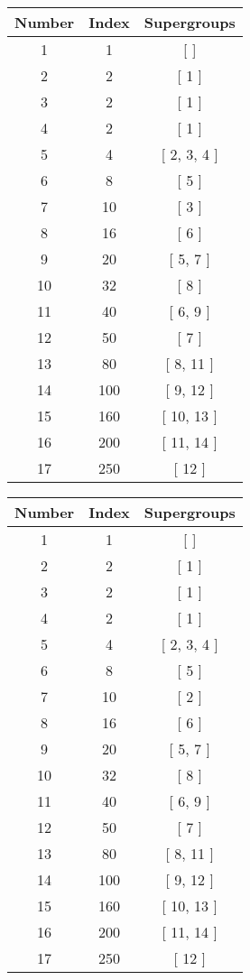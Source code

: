 \begin{center}
\begin{longtable}[H]{|| c c c ||}
\hline
Number & Index & Supergroups \\ 
\hline
1 & 1 & [  ] \\ 
\hline
2 & 2 & [ 1 ] \\ 
\hline
3 & 2 & [ 1 ] \\ 
\hline
4 & 2 & [ 1 ] \\ 
\hline
5 & 4 & [ 2, 3, 4 ] \\ 
\hline
6 & 8 & [ 5 ] \\ 
\hline
7 & 10 & [ 3 ] \\ 
\hline
8 & 16 & [ 6 ] \\ 
\hline
9 & 20 & [ 5, 7 ] \\ 
\hline
10 & 32 & [ 8 ] \\ 
\hline
11 & 40 & [ 6, 9 ] \\ 
\hline
12 & 50 & [ 7 ] \\ 
\hline
13 & 80 & [ 8, 11 ] \\ 
\hline
14 & 100 & [ 9, 12 ] \\ 
\hline
15 & 160 & [ 10, 13 ] \\ 
\hline
16 & 200 & [ 11, 14 ] \\ 
\hline
17 & 250 & [ 12 ] \\ 
\hline
\end{longtable}
\end{center}
\begin{center}
\begin{longtable}[H]{|| c c c ||}
\hline
Number & Index & Supergroups \\ 
\hline
1 & 1 & [  ] \\ 
\hline
2 & 2 & [ 1 ] \\ 
\hline
3 & 2 & [ 1 ] \\ 
\hline
4 & 2 & [ 1 ] \\ 
\hline
5 & 4 & [ 2, 3, 4 ] \\ 
\hline
6 & 8 & [ 5 ] \\ 
\hline
7 & 10 & [ 2 ] \\ 
\hline
8 & 16 & [ 6 ] \\ 
\hline
9 & 20 & [ 5, 7 ] \\ 
\hline
10 & 32 & [ 8 ] \\ 
\hline
11 & 40 & [ 6, 9 ] \\ 
\hline
12 & 50 & [ 7 ] \\ 
\hline
13 & 80 & [ 8, 11 ] \\ 
\hline
14 & 100 & [ 9, 12 ] \\ 
\hline
15 & 160 & [ 10, 13 ] \\ 
\hline
16 & 200 & [ 11, 14 ] \\ 
\hline
17 & 250 & [ 12 ] \\ 
\hline
\end{longtable}
\end{center}

